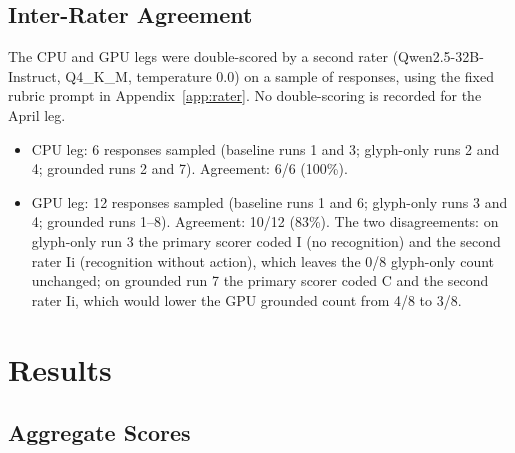 \documentclass[11pt,a4paper]{article}
\begin{document}
\subsection{Inter-Rater Agreement}\label{sec:irr}

The CPU and GPU legs were double-scored by a second rater
(Qwen2.5-32B-Instruct, Q4\_K\_M, temperature 0.0) on a sample of responses,
using the fixed rubric prompt in Appendix~\ref{app:rater}. No double-scoring is
recorded for the April leg.

\begin{itemize}
  \item CPU leg: 6 responses sampled (baseline runs 1 and 3; glyph-only runs 2
    and 4; grounded runs 2 and 7). Agreement: 6/6 (100\%).
  \item GPU leg: 12 responses sampled (baseline runs 1 and 6; glyph-only runs 3
    and 4; grounded runs 1--8). Agreement: 10/12 (83\%). The two disagreements: on
    glyph-only run 3 the primary scorer coded I (no recognition) and the
    second rater Ii (recognition without action), which leaves the 0/8
    glyph-only count unchanged; on grounded run 7 the primary scorer coded C
    and the second rater Ii, which would lower the GPU grounded count from
    4/8 to 3/8.
\end{itemize}

\section{Results}

\subsection{Aggregate Scores}
\end{document}
